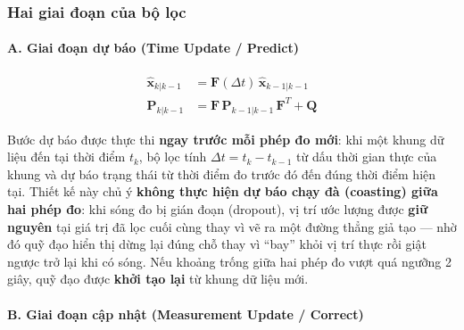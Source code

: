 \subsubsection{Hai giai đoạn của bộ lọc}

\paragraph*{A. Giai đoạn dự báo (Time Update / Predict)}

\begin{align}
    \hat{\mathbf{x}}_{k|k-1} &= \mathbf{F}(\Delta t)\, \hat{\mathbf{x}}_{k-1|k-1} \\
    \mathbf{P}_{k|k-1} &= \mathbf{F}\, \mathbf{P}_{k-1|k-1}\, \mathbf{F}^T + \mathbf{Q}
\end{align}

Bước dự báo được thực thi \textbf{ngay trước mỗi phép đo mới}: khi một khung dữ liệu đến tại thời điểm $t_k$, bộ lọc tính $\Delta t = t_k - t_{k-1}$ từ dấu thời gian thực của khung và dự báo trạng thái từ thời điểm đo trước đó đến đúng thời điểm hiện tại. Thiết kế này chủ ý \textbf{không thực hiện dự báo chạy đà (coasting) giữa hai phép đo}: khi sóng đo bị gián đoạn (dropout), vị trí ước lượng được \textbf{giữ nguyên} tại giá trị đã lọc cuối cùng thay vì vẽ ra một đường thẳng giả tạo --- nhờ đó quỹ đạo hiển thị dừng lại đúng chỗ thay vì ``bay'' khỏi vị trí thực rồi giật ngược trở lại khi có sóng. Nếu khoảng trống giữa hai phép đo vượt quá ngưỡng 2 giây, quỹ đạo được \textbf{khởi tạo lại} từ khung dữ liệu mới.

\paragraph*{B. Giai đoạn cập nhật (Measurement Update / Correct)}

